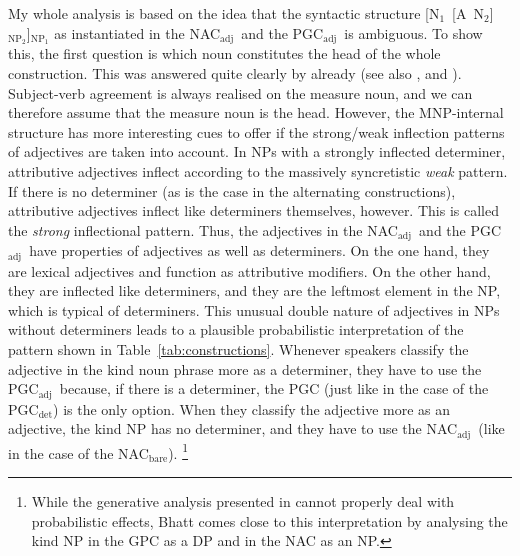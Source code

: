 \documentclass[USenglish]{article}
\newcommand{\Sub}[1]{\ensuremath{\mathrm{_{#1}}}}
\newcommand{\NACb}{NAC\Sub{bare}}
\newcommand{\NACa}{NAC\Sub{adj}}
\newcommand{\PGCd}{PGC\Sub{det}}
\newcommand{\PGCa}{PGC\Sub{adj}}
\begin{document}
My whole analysis is based on the idea that the syntactic structure [N\Sub{1}~[A~N\Sub{2}]\Sub{NP\Sub{2}}]\Sub{NP\Sub{1}} as instantiated in the \NACa\ and the \PGCa\ is ambiguous.
To show this, the first question is which noun constitutes the head of the whole construction.
This was answered quite clearly by \cite{Loebel1986} already (see also \citealp[213]{Eschenbach1994}, and \citealp[16]{GallmannLindauer1994}).
Subject-verb agreement is always realised on the measure noun, and we can therefore assume that the measure noun is the head.
However, the MNP-internal structure has more interesting cues to offer if the strong\slash weak inflection patterns of adjectives are taken into account.
In NPs with a strongly inflected determiner, attributive adjectives inflect according to the massively syncretistic \textit{weak} pattern.
If there is no determiner (as is the case in the alternating constructions), attributive adjectives inflect like determiners themselves, however.
This is called the \textit{strong} inflectional pattern.
Thus, the adjectives in the \NACa\ and the \PGCa\ have properties of adjectives as well as determiners.
On the one hand, they are lexical adjectives and function as attributive modifiers.
On the other hand, they are inflected like determiners, and they are the leftmost element in the NP, which is typical of determiners.
This unusual double nature of adjectives in NPs without determiners leads to a plausible probabilistic interpretation of the pattern shown in Table~\ref{tab:constructions}.
Whenever speakers classify the adjective in the kind noun phrase more as a determiner, they have to use the \PGCa\ because, if there is a determiner, the PGC (just like in the case of the \PGCd) is the only option.
When they classify the adjective more as an adjective, the kind NP has no determiner, and they have to use the \NACa\ (like in the case of the \NACb).%
\footnote{While the generative analysis presented in \cite{Bhatt1990} cannot properly deal with probabilistic effects, Bhatt comes close to this interpretation by analysing the kind NP in the GPC as a DP and in the NAC as an NP.}
\end{document}
